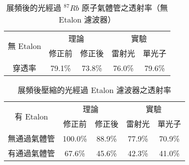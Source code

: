 \documentclass[class=NCU_thesis, crop=false]{standalone}
\begin{document}
\begin{table}[h]
    \centering
    \caption{展頻後的光經過 $^{87}Rb$ 原子氣體管之透射率（無 Etalon 濾波器）}
    \begin{tabular}{| c | c | c | c | c |}
\hline
\multirow{2}{*}{無 Etalon}& \multicolumn{2}{c|}{ 理論 } & \multicolumn{2}{c|}{ 實驗 }
\\ \cline{2-5}
         & 修正前 & 修正後 & 雷射光 & 單光子
    \\ \hline
    穿透率 & 79.1\% & 73.8\% & 76.0\% & 79.6\%\\ \hline
    \end{tabular}
    \label{tab:spread_abs}
\end{table}

\begin{table}[h]
    \centering
    \caption{展頻後壓縮的光經過 Etalon 濾波器之透射率}
    \begin{tabular}{| c | c | c | c | c |}
\hline
    \multirow{2}{*}{有 Etalon}& \multicolumn{2}{c|}{ 理論 } & \multicolumn{2}{c|}{ 實驗 }
    \\ \cline{2-5}
        & 修正前 & 修正後 & 雷射光 & 單光子
    \\ \hline
    無通過氣體管 & 100.0\% & 88.9\% & 77.9\% & 70.9\%\\ \hline
    有通過氣體管 & 67.6\% & 45.6\% & 42.3\% & 41.0\%\\ \hline
    \end{tabular}
    \label{tab:compress_abs}
\end{table}

\end{document}
